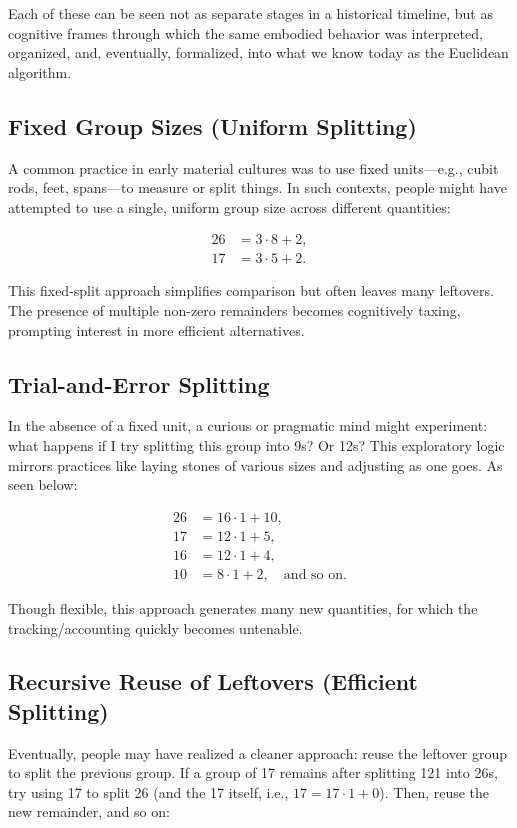 \documentclass{article}
\begin{document}
Each of these can be seen not as separate stages in a historical timeline, but as cognitive frames through which the same embodied behavior was interpreted, organized, and, eventually, formalized, into what we know today as the Euclidean algorithm.

\subsection{Fixed Group Sizes (Uniform Splitting)}
A common practice in early material cultures was to use fixed units—e.g., cubit rods, feet, spans—to measure or split things. In such contexts, people might have attempted to use a single, uniform group size across different quantities:

\begin{align*}
26 &= 3 \cdot 8 + 2, \\
17 &= 3 \cdot 5 + 2.
\end{align*}

This fixed-split approach simplifies comparison but often leaves many leftovers. The presence of multiple non-zero remainders becomes cognitively taxing, prompting interest in more efficient alternatives.

\subsection{Trial-and-Error Splitting}
In the absence of a fixed unit, a curious or pragmatic mind might experiment: what happens if I try splitting this group into 9s? Or 12s? This exploratory logic mirrors practices like laying stones of various sizes and adjusting as one goes. As seen below:

\begin{align*}
26 &= 16 \cdot 1 + 10, \\
17 &= 12 \cdot 1 + 5, \\
16 &= 12 \cdot 1 + 4, \\
10 &= 8 \cdot 1 + 2, \quad \text{and so on.}
\end{align*}

Though flexible, this approach generates many new quantities, for which the tracking/accounting quickly becomes untenable.

\subsection{Recursive Reuse of Leftovers (Efficient Splitting)}
Eventually, people may have realized a cleaner approach: reuse the leftover group to split the previous group. If a group of 17 remains after splitting 121 into 26s, try using 17 to split 26 (and the 17 itself, i.e., $17 = 17 \cdot 1  + 0$). Then, reuse the new remainder, and so on:
\end{document}
